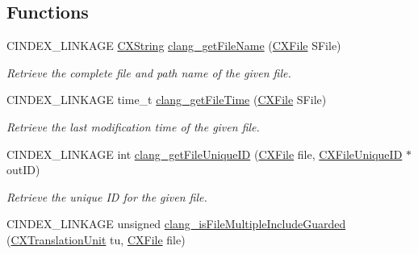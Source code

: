 \subsection*{Functions}
\begin{DoxyCompactItemize}
\item 
\mbox{\label{group__CINDEX__FILES_ga626ff6335ab1e0a2b8c8823301225690}} 
C\+I\+N\+D\+E\+X\+\_\+\+L\+I\+N\+K\+A\+GE \hyperlink{structCXString}{C\+X\+String} \hyperlink{group__CINDEX__FILES_ga626ff6335ab1e0a2b8c8823301225690}{clang\+\_\+get\+File\+Name} (\hyperlink{group__CINDEX__FILES_gacfcea9c1239c916597e2e5b3e109215a}{C\+X\+File} S\+File)
\begin{DoxyCompactList}\small\item\em Retrieve the complete file and path name of the given file. \end{DoxyCompactList}\item 
\mbox{\label{group__CINDEX__FILES_gac8444d2892e0d24fcf71a9dea8a475cb}} 
C\+I\+N\+D\+E\+X\+\_\+\+L\+I\+N\+K\+A\+GE time\+\_\+t \hyperlink{group__CINDEX__FILES_gac8444d2892e0d24fcf71a9dea8a475cb}{clang\+\_\+get\+File\+Time} (\hyperlink{group__CINDEX__FILES_gacfcea9c1239c916597e2e5b3e109215a}{C\+X\+File} S\+File)
\begin{DoxyCompactList}\small\item\em Retrieve the last modification time of the given file. \end{DoxyCompactList}\item 
C\+I\+N\+D\+E\+X\+\_\+\+L\+I\+N\+K\+A\+GE int \hyperlink{group__CINDEX__FILES_gafeef0a8288de8c14e95e4d6c249aaf1e}{clang\+\_\+get\+File\+Unique\+ID} (\hyperlink{group__CINDEX__FILES_gacfcea9c1239c916597e2e5b3e109215a}{C\+X\+File} file, \hyperlink{structCXFileUniqueID}{C\+X\+File\+Unique\+ID} $\ast$out\+ID)
\begin{DoxyCompactList}\small\item\em Retrieve the unique ID for the given {\ttfamily file}. \end{DoxyCompactList}\item 
\mbox{\label{group__CINDEX__FILES_ga1969fe907a40d9469ea68c370d0f602a}} 
C\+I\+N\+D\+E\+X\+\_\+\+L\+I\+N\+K\+A\+GE unsigned \hyperlink{group__CINDEX__FILES_ga1969fe907a40d9469ea68c370d0f602a}{clang\+\_\+is\+File\+Multiple\+Include\+Guarded} (\hyperlink{group__CINDEX_gacdb7815736ca709ce9a5e1ec2b7e16ac}{C\+X\+Translation\+Unit} tu, \hyperlink{group__CINDEX__FILES_gacfcea9c1239c916597e2e5b3e109215a}{C\+X\+File} file)

\end{DoxyCompactItemize}

